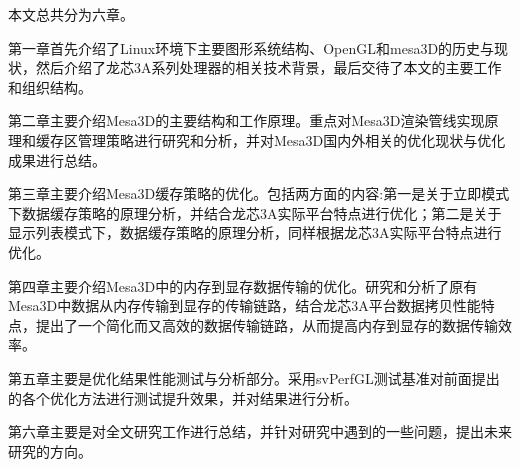 
本文总共分为六章。

第一章首先介绍了Linux环境下主要图形系统结构、OpenGL和mesa3D的历史与现状，然后介绍了龙芯3A系列处理器的相关技术背景，最后交待了本文的主要工作和组织结构。

第二章主要介绍Mesa3D的主要结构和工作原理。重点对Mesa3D渲染管线实现原理和缓存区管理策略进行研究和分析，并对Mesa3D国内外相关的优化现状与优化成果进行总结。

第三章主要介绍Mesa3D缓存策略的优化。包括两方面的内容:第一是关于立即模式下数据缓存策略的原理分析，并结合龙芯3A实际平台特点进行优化；第二是关于显示列表模式下，数据缓存策略的原理分析，同样根据龙芯3A实际平台特点进行优化。

第四章主要介绍Mesa3D中的内存到显存数据传输的优化。研究和分析了原有Mesa3D中数据从内存传输到显存的传输链路，结合龙芯3A平台数据拷贝性能特点，提出了一个简化而又高效的数据传输链路，从而提高内存到显存的数据传输效率。

第五章主要是优化结果性能测试与分析部分。采用svPerfGL测试基准对前面提出的各个优化方法进行测试提升效果，并对结果进行分析。

第六章主要是对全文研究工作进行总结，并针对研究中遇到的一些问题，提出未来研究的方向。

